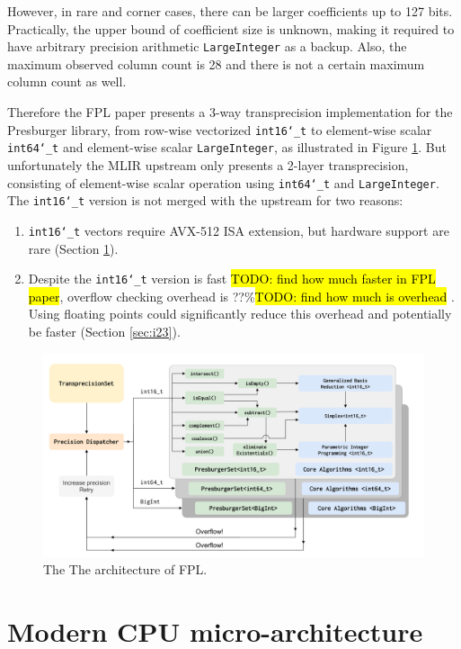 \documentclass[logo,bsc,singlespacing,parskip]{infthesis}
\newcommand{\dtshort}{\texttt{int16\char`_t} }
\newcommand{\dtlong}{\texttt{int64\char`_t} }
\newenvironment{compactlist}
{ \begin{enumerate}
    \setlength{\itemsep}{0pt}
    \setlength{\parskip}{0pt}
    \setlength{\parsep}{0pt}     
}
{ \end{enumerate} }
\begin{document}
However, in rare and corner cases, there can be larger coefficients up to 127
bits. Practically, the upper bound of coefficient size is unknown, making it
required to have arbitrary precision arithmetic \texttt{LargeInteger} as a
backup. Also, the maximum observed column count is 28 and there is not a certain
maximum column count as well. 

Therefore the FPL paper presents a 3-way transprecision implementation for the
Presburger library, from row-wise vectorized \dtshort to element-wise
scalar \dtlong and element-wise scalar \texttt{LargeInteger}, as
illustrated in Figure \ref{fig:fpl_arch}. But unfortunately the MLIR upstream
only presents a 2-layer transprecision, consisting of element-wise scalar
operation using \dtlong and \texttt{LargeInteger}. The
\dtshort version is not merged with the upstream for two reasons: 
\begin{compactlist} 
    \item \dtshort vectors require AVX-512 ISA extension, but hardware
    support are rare (Section \ref{sec:avx512}). 
    \item Despite the \dtshort version is fast \hl{TODO: find how much
    faster in FPL paper}, overflow checking overhead is ??\%\hl{TODO: find how
    much is overhead} \cite{FPL2}. Using floating points could significantly
    reduce this overhead and potentially be faster (Section \ref{sec:i23}).  
\end{compactlist}


\begin{figure}
    \includegraphics[width=\linewidth]{image/transprecision.png}
    \caption{The The architecture of FPL.}
    \label{fig:fpl_arch}
\end{figure}

\section{Modern CPU micro-architecture}
\label{sec:avx512}
\end{document}
